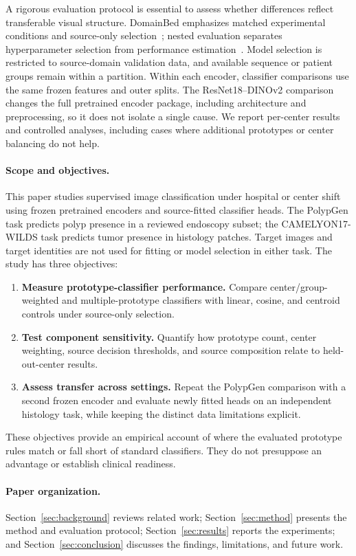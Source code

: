 A rigorous evaluation protocol is essential to assess whether differences reflect transferable visual structure. DomainBed emphasizes matched experimental conditions and source-only selection~\cite{gulrajani2021domainbed}; nested evaluation separates hyperparameter selection from performance estimation~\cite{varma2006bias}. Model selection is restricted to source-domain validation data, and available sequence or patient groups remain within a partition. Within each encoder, classifier comparisons use the same frozen features and outer splits. The ResNet18--DINOv2 comparison changes the full pretrained encoder package, including architecture and preprocessing, so it does not isolate a single cause. We report per-center results and controlled analyses, including cases where additional prototypes or center balancing do not help.

\paragraph{Scope and objectives.}
This paper studies supervised image classification under hospital or center shift using frozen pretrained encoders and source-fitted classifier heads. The PolypGen task predicts polyp presence in a reviewed endoscopy subset; the CAMELYON17-WILDS task predicts tumor presence in histology patches. Target images and target identities are not used for fitting or model selection in either task. The study has three objectives:
\begin{enumerate}
    \item \textbf{Measure prototype-classifier performance.} Compare center/group-weighted and multiple-prototype classifiers with linear, cosine, and centroid controls under source-only selection.
    \item \textbf{Test component sensitivity.} Quantify how prototype count, center weighting, source decision thresholds, and source composition relate to held-out-center results.
    \item \textbf{Assess transfer across settings.} Repeat the PolypGen comparison with a second frozen encoder and evaluate newly fitted heads on an independent histology task, while keeping the distinct data limitations explicit.
\end{enumerate}
These objectives provide an empirical account of where the evaluated prototype rules match or fall short of standard classifiers. They do not presuppose an advantage or establish clinical readiness.

\paragraph{Paper organization.}
Section~\ref{sec:background} reviews related work; Section~\ref{sec:method} presents the method and evaluation protocol; Section~\ref{sec:results} reports the experiments; and Section~\ref{sec:conclusion} discusses the findings, limitations, and future work.
